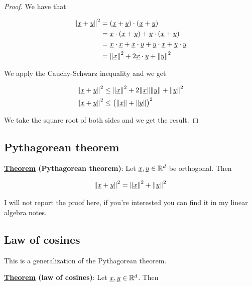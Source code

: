 \documentclass[10pt]{extarticle}
\renewcommand{\vec}[1]{\underbar{\ensuremath{#1}}}
\begin{document}
\begin{proof}
    We have that

    \begin{align*}
        \norm{\vec{x} + \vec{y}}^2 & = (\vec{x} + \vec{y}) \cdot (\vec{x} + \vec{y})                                                 \\
                                   & = \vec{x} \cdot (\vec{x} + \vec{y}) + \vec{y} \cdot (\vec{x} + \vec{y})                         \\
                                   & = \vec{x} \cdot \vec{x} + \vec{x} \cdot \vec{y} + \vec{y} \cdot \vec{x} + \vec{y} \cdot \vec{y} \\
                                   & = \norm{\vec{x}}^2 + 2 \vec{x} \cdot \vec{y} + \norm{\vec{y}}^2
    \end{align*}

    We apply the Cauchy-Schwarz inequality and we get

    \begin{align*}
        \norm{\vec{x} + \vec{y}}^2 & \leq \norm{\vec{x}}^2 + 2 \norm{\vec{x}} \norm{\vec{y}} + \norm{\vec{y}}^2 \\
        \norm{\vec{x} + \vec{y}}^2 & \leq \left(\norm{\vec{x}} + \norm{\vec{y}}\right)^2
    \end{align*}

    We take the square root of both sides and we get the result.
\end{proof}

\subsection{Pythagorean theorem}

\textbf{\underline{Theorem} (Pythagorean theorem)}: Let $\vec{x}, \vec{y} \in \R^d$ be orthogonal. Then

$$
    \norm{\vec{x} + \vec{y}}^2 = \norm{\vec{x}}^2 + \norm{\vec{y}}^2
$$

I will not report the proof here, if you're interested you can find it in my linear algebra notes.

\subsection{Law of cosines}

This is a generalization of the Pythagorean theorem.

\textbf{\underline{Theorem} (law of cosines)}: Let $\vec{x}, \vec{y} \in \R^d$. Then
\end{document}
